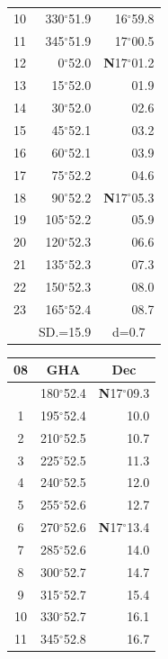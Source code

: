 \documentclass[10pt, a4paper]{report}
\begin{document}
\begin{scriptsize}
\begin{tabular*}{0.2\textwidth}[t]{@{\extracolsep{\fill}}|c|rr|}
10 & 330$^\circ$51.9 & 16$^\circ$59.8\\
11 & 345$^\circ$51.9 & 17$^\circ$00.5\\[2Pt]
12 & 0$^\circ$52.0 & \textbf{N}17$^\circ$01.2\\
13 & 15$^\circ$52.0 & 01.9\\
14 & 30$^\circ$52.0 & 02.6\\
15 & 45$^\circ$52.1 & \raisebox{0.24ex}{\boldmath$\cdot$~\boldmath$\cdot$~~}03.2\\
16 & 60$^\circ$52.1 & 03.9\\
17 & 75$^\circ$52.2 & 04.6\\[2Pt]
18 & 90$^\circ$52.2 & \textbf{N}17$^\circ$05.3\\
19 & 105$^\circ$52.2 & 05.9\\
20 & 120$^\circ$52.3 & 06.6\\
21 & 135$^\circ$52.3 & \raisebox{0.24ex}{\boldmath$\cdot$~\boldmath$\cdot$~~}07.3\\
22 & 150$^\circ$52.3 & 08.0\\
23 & 165$^\circ$52.4 & 08.7\\
\hline
\rule{0pt}{2.4ex} & \multicolumn{1}{c}{SD.=15.9} & \multicolumn{1}{c|}{d=0.7}\\
\hline
\end{tabular*}\noindent
\begin{tabular*}{0.2\textwidth}[t]{@{\extracolsep{\fill}}|c|rr|}
\hline
\multicolumn{1}{|c|}{\rule{0pt}{2.6ex}\textbf{08}} & \multicolumn{1}{c}{\textbf{GHA}} & \multicolumn{1}{c|}{\textbf{Dec}}\\
\hline\rule{0pt}{2.6ex}\noindent
0 & 180$^\circ$52.4 & \textbf{N}17$^\circ$09.3\\
1 & 195$^\circ$52.4 & 10.0\\
2 & 210$^\circ$52.5 & 10.7\\
3 & 225$^\circ$52.5 & \raisebox{0.24ex}{\boldmath$\cdot$~\boldmath$\cdot$~~}11.3\\
4 & 240$^\circ$52.5 & 12.0\\
5 & 255$^\circ$52.6 & 12.7\\[2Pt]
6 & 270$^\circ$52.6 & \textbf{N}17$^\circ$13.4\\
7 & 285$^\circ$52.6 & 14.0\\
8 & 300$^\circ$52.7 & 14.7\\
9 & 315$^\circ$52.7 & \raisebox{0.24ex}{\boldmath$\cdot$~\boldmath$\cdot$~~}15.4\\
10 & 330$^\circ$52.7 & 16.1\\
11 & 345$^\circ$52.8 & 16.7\\[2Pt]

\end{tabular*}
\end{scriptsize}
\end{document}
